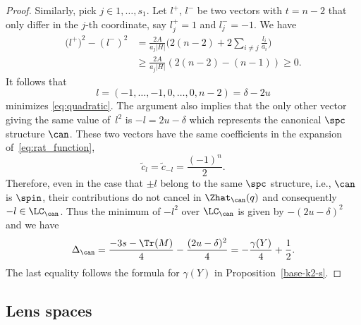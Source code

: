 \documentclass[pdftex]{sigma}
\begin{document}
\begin{proof}
Similarly, pick $j \in 1,\dots, s_1.$ Let $l^+$, $l^-$ be two vectors with $t = n-2$ that only differ in the $j$-th coordinate, say $l_j^+=1$ and $l^-_j=-1$. We have
\begin{align*}
 \bigl(l^+\bigr)^2 - (l^-)^2 & = \frac{2A}{a_j |H|} \biggl(2(n-2) + 2\sum_{i \neq j} \frac{l_i}{a_i}\biggr) \\
 & \geq \frac{2A}{a_j |H|} (2(n-2) - (n-1)) \geq 0.
\end{align*}
It follows that
\[
 l = (-1,\dots, -1, 0, \dots, 0, n-2) = \delta - 2u
\]
minimizes \eqref{eq:quadratic}. The argument also implies that the only other vector giving the same value of~$l^2$ is $-l=2u-\delta$ which represents the canonical $\spc$ structure $\can$. These two vectors have the same coefficients in the expansion of~\eqref{eq:rat_function},
\[
\tilde{c}_l = \tilde{c}_{-l} = \frac{(-1)^n}{2}.
\]
Therefore, even in the case that $\pm l$ belong to the same $\spc$ structure, i.e., $\can$ is $\spin$, their contributions do not cancel in $\Zhat_{\can}(q)$ and consequently $-l \in \LC_{\can}$.
Thus the minimum of $-l^2$ over $\LC_{\can}$ is given by $-(2u-\delta)^2$ and we have
 \begin{equation*}%
 \Delta_{\can} = \frac{-3s - \Tr(M)}{4} - \frac{(2u-\delta)^2}{4} = - \frac{\gamma(Y)}{4} + \frac{1}{2}.
 \end{equation*}
 The last equality follows the formula for $\gamma(Y)$ in Proposition~\ref{base-k2-s}.
\end{proof}

\subsection{Lens spaces}\label{ssec:lens}
\end{document}
